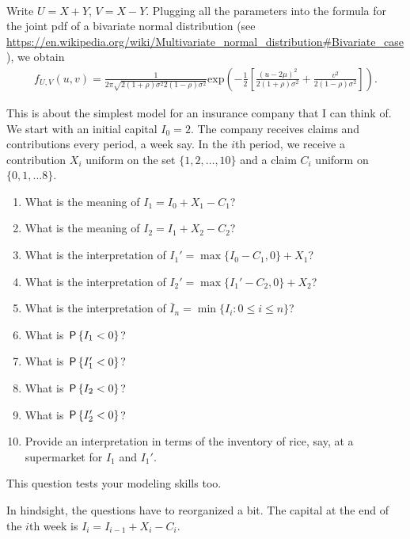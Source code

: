 \begin{exercise}
\begin{solution}
\begin{enumerate}
\begin{align}
    \end{align}
    Write $U = X+Y$, $V = X - Y$. Plugging all the parameters into the formula for the joint pdf of a bivariate normal distribution (see \url{https://en.wikipedia.org/wiki/Multivariate_normal_distribution#Bivariate_case}), we obtain
    \begin{align}
        f_{U,V}(u,v) = \frac{1}{2\pi\sqrt{2(1+\rho)\sigma^2 2(1-\rho)\sigma^2} } \text{exp}\left(-\frac{1}{2}\left[\frac{(u - 2\mu)^2}{2(1+\rho)\sigma^2} + \frac{v^2}{2(1-\rho)\sigma^2} \right]\right).
    \end{align}
\end{enumerate}
\end{solution}
\end{exercise}




\begin{exercise}
This is about the simplest model for an insurance company that I can think of.
We start with an initial capital $I_0=2$.
The company receives claims and contributions every period, a week say.
In the $i$th period, we receive a contribution $X_{i}$ uniform on the set $\{1, 2,\ldots,10\}$ and a claim $C_i$ uniform on $\{0, 1, \ldots 8\}$.
\begin{enumerate}
\item What is the meaning of $I_1=I_0+X_1-C_1$?
\item What is the meaning of $I_2=I_1+X_2-C_2$?
\item What is the interpretation of $I_1'=\max\{I_0-C_1,0\} + X_1$?
\item What is the interpretation of $I_2'=\max\{I_1'-C_2,0\} + X_2$?
\item What is the interpretation of $\bar I_{n} = \min\{I_{i} : 0\leq i\leq n\}$?
\item What is  $\P{I_1 < 0}$?
\item What is  $\P{I_1' < 0}$?
\item What is  $\P{I_2 < 0}$?
\item What is  $\P{I_2' < 0}$?
\item Provide an interpretation in terms of the inventory of rice, say, at a supermarket for $I_{1}$ and $I_{1}'$.
\end{enumerate}
\begin{solution}
This question tests your modeling skills too.

In hindsight, the questions have to reorganized a bit.
The capital at the end of the $i$th week is $I_{i} = I_{i-1} + X_{i} - C_{i}$.


\end{solution}
\end{exercise}
